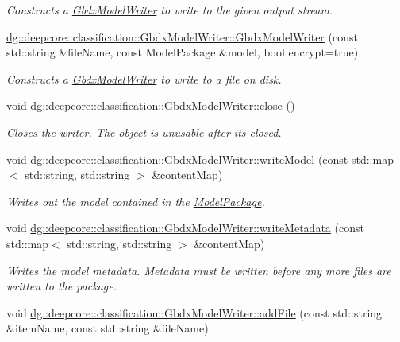 \begin{DoxyCompactItemize}
\begin{DoxyCompactList}\small\item\em Constructs a \hyperlink{classdg_1_1deepcore_1_1classification_1_1_gbdx_model_writer}{Gbdx\+Model\+Writer} to write to the given output stream. \end{DoxyCompactList}\item 
\hyperlink{group___classification_module_ga6806ebdaff05b3ff528a9c0fff8fe494}{dg\+::deepcore\+::classification\+::\+Gbdx\+Model\+Writer\+::\+Gbdx\+Model\+Writer} (const std\+::string \&file\+Name, const Model\+Package \&model, bool encrypt=true)
\begin{DoxyCompactList}\small\item\em Constructs a \hyperlink{classdg_1_1deepcore_1_1classification_1_1_gbdx_model_writer}{Gbdx\+Model\+Writer} to write to a file on disk. \end{DoxyCompactList}\item 
void \hyperlink{group___classification_module_gabb8c5d415c526a83a3c4e9222bfada9b}{dg\+::deepcore\+::classification\+::\+Gbdx\+Model\+Writer\+::close} ()
\begin{DoxyCompactList}\small\item\em Closes the writer. The object is unusable after it\textquotesingle{}s closed. \end{DoxyCompactList}\item 
void \hyperlink{group___classification_module_gaddc807cb470f47457237613199395f54}{dg\+::deepcore\+::classification\+::\+Gbdx\+Model\+Writer\+::write\+Model} (const std\+::map$<$ std\+::string, std\+::string $>$ \&content\+Map)
\begin{DoxyCompactList}\small\item\em Writes out the model contained in the \hyperlink{classdg_1_1deepcore_1_1classification_1_1_model_package}{Model\+Package}. \end{DoxyCompactList}\item 
void \hyperlink{group___classification_module_gaf870ec5ffa5611fbc185a31964180c25}{dg\+::deepcore\+::classification\+::\+Gbdx\+Model\+Writer\+::write\+Metadata} (const std\+::map$<$ std\+::string, std\+::string $>$ \&content\+Map)
\begin{DoxyCompactList}\small\item\em Writes the model metadata. Metadata must be written before any more files are written to the package. \end{DoxyCompactList}\item 
void \hyperlink{group___classification_module_gae289cee9ebc10a5cb834404c73e3dd7e}{dg\+::deepcore\+::classification\+::\+Gbdx\+Model\+Writer\+::add\+File} (const std\+::string \&item\+Name, const std\+::string \&file\+Name)

\end{DoxyCompactItemize}
